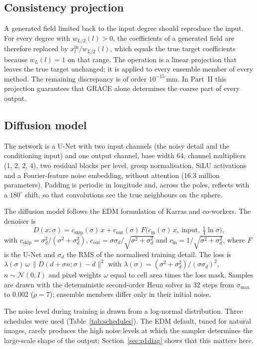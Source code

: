 \documentclass[11pt,a4paper]{article}
\begin{document}
\subsection{Consistency projection}
A generated field limited back to the input degree should reproduce the input. For every degree
with $w_{L/2}(l) > 0$, the coefficients of a generated field are therefore replaced by
$x^{\mathrm{in}}_l / w_{L/2}(l)$, which equals the true target coefficients because
$w_L(l) = 1$ on that range. The operation is a linear projection that leaves the true target
unchanged; it is applied to every ensemble member of every method. The remaining discrepancy is
of order $10^{-15}$\,mm. In Part~II this projection guarantees that GRACE alone determines the
coarse part of every output.

\subsection{Diffusion model}
The network is a U-Net with two input channels (the noisy detail and the conditioning input)
and one output channel, base width 64, channel multipliers (1, 2, 2, 4), two residual blocks per
level, group normalisation, SiLU activations and a Fourier-feature noise embedding, without
attention (16.3 million parameters). Padding is periodic in longitude and, across the poles,
reflects with a $180^\circ$ shift, so that convolutions see the true neighbours on the sphere.

The diffusion model follows the EDM formulation of Karras and co-workers. The denoiser is
\begin{equation}
  D(x;\sigma) = c_\mathrm{skip}(\sigma)\,x + c_\mathrm{out}(\sigma)\,
    F\bigl(c_\mathrm{in}(\sigma)\,x,\ \mathrm{input},\ \tfrac14\ln\sigma\bigr),
\end{equation}
with $c_\mathrm{skip} = \sigma_d^2/(\sigma^2+\sigma_d^2)$,
$c_\mathrm{out} = \sigma\sigma_d/\sqrt{\sigma^2+\sigma_d^2}$ and
$c_\mathrm{in} = 1/\sqrt{\sigma^2+\sigma_d^2}$, where $F$ is the U-Net and $\sigma_d$ the RMS of
the normalised training detail. The loss is
$\lambda(\sigma)\,\omega\,\lVert D(d + \sigma n;\sigma) - d\rVert^2$ with
$\lambda(\sigma) = (\sigma^2+\sigma_d^2)/(\sigma\sigma_d)^2$, $n \sim \mathcal N(0, I)$ and
pixel weights $\omega$ equal to cell area times the loss mask. Samples are drawn with the
deterministic second-order Heun solver in 32 steps from $\sigma_\mathrm{max}$ to 0.002
($\rho = 7$); ensemble members differ only in their initial noise.

The noise level during training is drawn from a log-normal distribution. Three schedules
were used (Table~\ref{tab:schedules}). The EDM default, tuned for natural images,
rarely produces the high noise levels at which the sampler determines the large-scale shape of
the output; Section~\ref{sec:p1diag} shows that this matters here.
\end{document}

